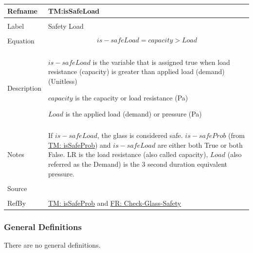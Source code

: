 \documentclass[12pt]{article}
\begin{document}
\noindent \begin{minipage}{\textwidth}
\begin{tabular}{>{\raggedright}p{}>{\raggedright\arraybackslash}p{}}
\toprule \textbf{Refname} & \textbf{TM:isSafeLoad}
\label{TM:isSafeLoad}
\\ \midrule \\
Label & Safety Load
        
\\ \midrule \\
Equation & \begin{displaymath}
           is-safeLoad=capacity>Load
           \end{displaymath}
\\ \midrule \\
Description & \begin{symbDescription}
              \item{$is-safeLoad$ is the variable that is assigned true when load resistance (capacity) is greater than applied load (demand) (Unitless)}
              \item{$capacity$ is the capacity or load resistance (Pa)}
              \item{$Load$ is the applied load (demand) or pressure (Pa)}
              \end{symbDescription}
\\ \midrule \\
Notes & If $is-safeLoad$, the glass is considered safe. $is-safeProb$ (from \hyperref[TM:isSafeProb]{TM: isSafeProb}) and $is-safeLoad$ are either both True or both False. LR is the load resistance (also called capacity), $Load$ (also referred as the Demand) is the 3 second duration equivalent pressure.
        
\\ \midrule \\
Source & \cite{astm2009}
         
\\ \midrule \\
RefBy & \hyperref[TM:isSafeProb]{TM: isSafeProb} and \hyperref[checkGlassSafety]{FR: Check-Glass-Safety}
        
\\ \bottomrule
\end{tabular}
\end{minipage}
\subsubsection{General Definitions}
\label{Sec:GDs}
There are no general definitions.
\end{document}
